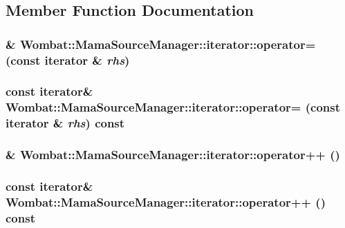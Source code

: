 \subsection{Member Function Documentation}
\hypertarget{classWombat_1_1MamaSourceManager_1_1iterator_afe9d766f0409bb92af4398589df5aef9}{
\subsubsection[{operator=}]{\& Wombat::MamaSourceManager::iterator::operator= (const {\bf iterator} \& {\em rhs})}}
\label{classWombat_1_1MamaSourceManager_1_1iterator_afe9d766f0409bb92af4398589df5aef9}
\hypertarget{classWombat_1_1MamaSourceManager_1_1iterator_a6768646f21e818ad2d7cb445c19164e1}{
\subsubsection[{operator=}]{\setlength{\rightskip}{0pt plus 5cm}const {\bf iterator}\& Wombat::MamaSourceManager::iterator::operator= (const {\bf iterator} \& {\em rhs}) const}}
\label{classWombat_1_1MamaSourceManager_1_1iterator_a6768646f21e818ad2d7cb445c19164e1}
\hypertarget{classWombat_1_1MamaSourceManager_1_1iterator_a590c4be56cc77365f39240cdbf4aa22f}{
\subsubsection[{operator++}]{\& Wombat::MamaSourceManager::iterator::operator++ ()}}
\label{classWombat_1_1MamaSourceManager_1_1iterator_a590c4be56cc77365f39240cdbf4aa22f}
\hypertarget{classWombat_1_1MamaSourceManager_1_1iterator_a3b19e940ac1e731044cfc6c6e2323860}{
\subsubsection[{operator++}]{\setlength{\rightskip}{0pt plus 5cm}const {\bf iterator}\& Wombat::MamaSourceManager::iterator::operator++ () const}}
